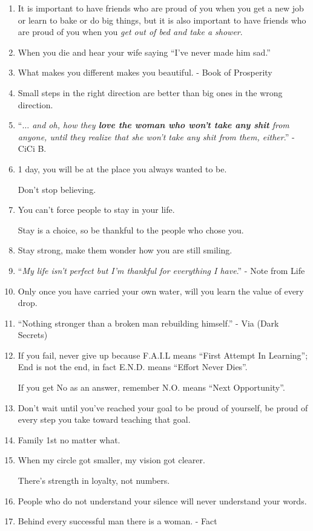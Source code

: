 \documentclass{article}
\numberwithin{equation}{section}
\begin{document}
\begin{enumerate}
    The alphabet has 25 more letters!
    
    Stay Cool.
    \item It is important to have friends who are proud of you when you get a new job or learn to bake or do big things, but it is also important to have friends who are proud of you when you \textit{get out of bed and take a shower}.
    \item When you die and hear your wife saying ``I've never made him sad.''
    \item What makes you different makes you beautiful. - Book of Prosperity
    \item Small steps in the right direction are better than big ones in the wrong direction.
    \item ``\textit{$\ldots$ and oh, how they \textbf{love the woman who won't take any shit} from anyone, until they realize that she won't take any shit from them, either}.'' - CiCi B.
    \item 1 day, you will be at the place you always wanted to be.
    
    Don't stop believing.
    \item You can't force people to stay in your life.
    
    Stay is a choice, so be thankful to the people who chose you.
    \item Stay strong, make them wonder how you are still smiling.
    \item ``\textit{My life isn't perfect but I'm thankful for everything I have}.'' - Note from Life
    \item Only once you have carried your own water, will you learn the value of every drop.
    \item ``Nothing stronger than a broken man rebuilding himself.'' - Via (Dark Secrets)
    \item If you fail, never give up because F.A.I.L means ``First Attempt In Learning''; End is not the end, in fact E.N.D. means ``Effort Never Dies''.
    
    If you get No as an answer, remember N.O. means ``Next Opportunity''.
    \item Don't wait until you've reached your goal to be proud of yourself, be proud of every step you take toward teaching that goal.
    \item Family 1st no matter what.
    \item When my circle got smaller, my vision got clearer.
    
    There's strength in loyalty, not numbers.
    \item People who do not understand your silence will never understand your words.
    \item Behind every successful man there is a woman. - Fact
    

\end{enumerate}
\end{document}
